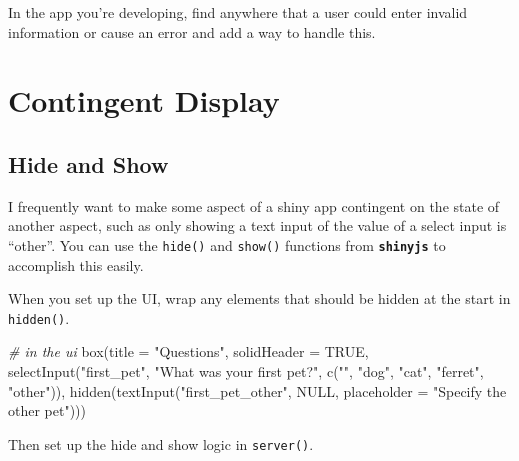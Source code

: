 \documentclass[
  oneside]{book}
\newenvironment{Shaded}{\begin{snugshade}}{\end{snugshade}}
\newcommand{\AttributeTok}[1]{\textcolor[rgb]{0.77,0.63,0.00}{#1}}
\newcommand{\CommentTok}[1]{\textcolor[rgb]{0.56,0.35,0.01}{\textit{#1}}}
\newcommand{\ConstantTok}[1]{\textcolor[rgb]{0.00,0.00,0.00}{#1}}
\newcommand{\ControlFlowTok}[1]{\textcolor[rgb]{0.13,0.29,0.53}{\textbf{#1}}}
\newcommand{\FunctionTok}[1]{\textcolor[rgb]{0.00,0.00,0.00}{#1}}
\newcommand{\NormalTok}[1]{#1}
\newcommand{\SpecialCharTok}[1]{\textcolor[rgb]{0.00,0.00,0.00}{#1}}
\newcommand{\StringTok}[1]{\textcolor[rgb]{0.31,0.60,0.02}{#1}}
\begin{document}
In the app you're developing, find anywhere that a user could enter invalid information or cause an error and add a way to handle this.

\hypertarget{contingency}{%
\chapter{Contingent Display}\label{contingency}}

\hypertarget{hide-and-show}{%
\section{Hide and Show}\label{hide-and-show}}

I frequently want to make some aspect of a shiny app contingent on the state of another aspect, such as only showing a text input of the value of a select input is ``other''. You can use the \texttt{hide}\texttt{()} and \texttt{show}\texttt{()} functions from \textbf{\texttt{shinyjs}} to accomplish this easily.

When you set up the UI, wrap any elements that should be hidden at the start in \texttt{hidden}\texttt{()}.

\begin{Shaded}
\begin{Highlighting}[]
\CommentTok{\# in the ui}
\FunctionTok{box}\NormalTok{(}\AttributeTok{title =} \StringTok{"Questions"}\NormalTok{, }\AttributeTok{solidHeader =} \ConstantTok{TRUE}\NormalTok{, }\FunctionTok{selectInput}\NormalTok{(}\StringTok{"first\_pet"}\NormalTok{, }\StringTok{"What was your first pet?"}\NormalTok{,}
    \FunctionTok{c}\NormalTok{(}\StringTok{""}\NormalTok{, }\StringTok{"dog"}\NormalTok{, }\StringTok{"cat"}\NormalTok{, }\StringTok{"ferret"}\NormalTok{, }\StringTok{"other"}\NormalTok{)), }\FunctionTok{hidden}\NormalTok{(}\FunctionTok{textInput}\NormalTok{(}\StringTok{"first\_pet\_other"}\NormalTok{,}
    \ConstantTok{NULL}\NormalTok{, }\AttributeTok{placeholder =} \StringTok{"Specify the other pet"}\NormalTok{)))}
\end{Highlighting}
\end{Shaded}

Then set up the hide and show logic in \texttt{server}\texttt{()}.

\begin{Shaded}
\end{Shaded}
\end{document}
